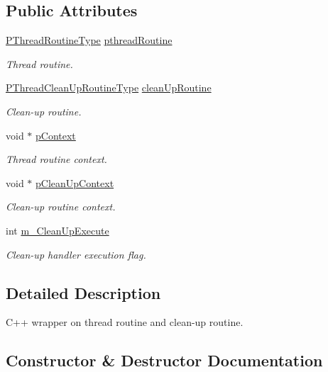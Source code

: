 \subsection*{Public Attributes}
\begin{DoxyCompactItemize}
\item 
\hyperlink{group__FUNC__DEFS_gaeef66643e734485d781ca826339879ea}{P\+Thread\+Routine\+Type} \hyperlink{structRunnable_ad850dfe862b73a3e9f59c5fe383bd20d}{pthread\+Routine}
\begin{DoxyCompactList}\small\item\em Thread routine. \end{DoxyCompactList}\item 
\hyperlink{group__FUNC__DEFS_ga77ca9e695666040451b77632df4847b9}{P\+Thread\+Clean\+Up\+Routine\+Type} \hyperlink{structRunnable_a62c14bef1f2acabcff9c126faf9c0218}{clean\+Up\+Routine}
\begin{DoxyCompactList}\small\item\em Clean-\/up routine. \end{DoxyCompactList}\item 
void $\ast$ \hyperlink{structRunnable_a5b950239feca1d3033297fae933209e9}{p\+Context}
\begin{DoxyCompactList}\small\item\em Thread routine context. \end{DoxyCompactList}\item 
void $\ast$ \hyperlink{structRunnable_a30fc8274b7103f58fbbd56aa165692b4}{p\+Clean\+Up\+Context}
\begin{DoxyCompactList}\small\item\em Clean-\/up routine context. \end{DoxyCompactList}\item 
int \hyperlink{structRunnable_aee103a0bc58c7dc4a92da67eac8436fc}{m\+\_\+\+Clean\+Up\+Execute}
\begin{DoxyCompactList}\small\item\em Clean-\/up handler execution flag. \end{DoxyCompactList}\end{DoxyCompactItemize}


\subsection{Detailed Description}
C++ wrapper on thread routine and clean-\/up routine. 

\subsection{Constructor \& Destructor Documentation}
\mbox{\label{structRunnable_a55a54a10b0f3733f276d07db584f2549}} 
